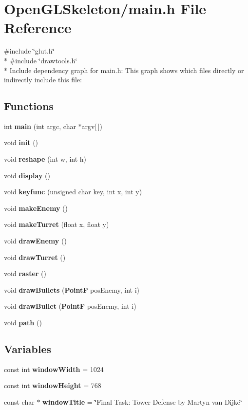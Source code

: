 \section{Open\+G\+L\+Skeleton/main.h File Reference}
\label{main_8h}
{\ttfamily \#include \char`\"{}glut.\+h\char`\"{}}\\*
{\ttfamily \#include \char`\"{}drawtools.\+h\char`\"{}}\\*
Include dependency graph for main.\+h\+:
This graph shows which files directly or indirectly include this file\+:
\subsection*{Functions}
\begin{DoxyCompactItemize}
\item 
int {\bf main} (int argc, char $\ast$argv[$\,$])
\item 
void {\bf init} ()
\item 
void {\bf reshape} (int w, int h)
\item 
void {\bf display} ()
\item 
void {\bf keyfunc} (unsigned char key, int x, int y)
\item 
void {\bf make\+Enemy} ()
\item 
void {\bf make\+Turret} (float x, float y)
\item 
void {\bf draw\+Enemy} ()
\item 
void {\bf draw\+Turret} ()
\item 
void {\bf raster} ()
\item 
void {\bf draw\+Bullets} ({\bf PointF} pos\+Enemy, int i)
\item 
void {\bf draw\+Bullet} ({\bf PointF} pos\+Enemy, int i)
\item 
void {\bf path} ()
\end{DoxyCompactItemize}
\subsection*{Variables}
\begin{DoxyCompactItemize}
\item 
const int {\bf window\+Width} = 1024
\item 
const int {\bf window\+Height} = 768
\item 
const char $\ast$ {\bf window\+Title} = \char`\"{}Final Task\+: Tower Defense by Martyn van Dijke\char`\"{}
\end{DoxyCompactItemize}


